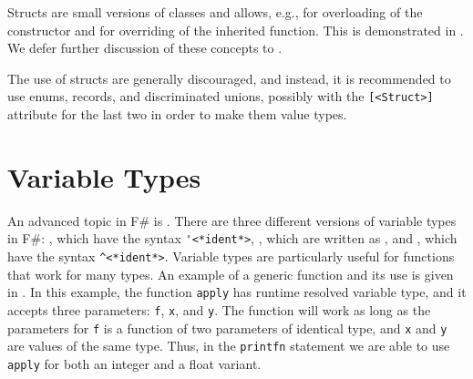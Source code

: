 \documentclass[fsharpnotes.tex]{subfiles}
\begin{document}
Structs are small versions of classes and allows, e.g., for overloading of the  constructor and for overriding of the inherited  function. This is demonstrated in .
%
%
We defer further discussion of these concepts to .

The use of structs are generally discouraged, and instead, it is recommended to use enums, records, and discriminated unions, possibly with the \lstinline{[<Struct>]} attribute for the last two in order to make them value types.

\section{Variable Types}
\label{sec:variableTypes}
An advanced topic in F\# is . There are three different versions of variable types in F\#: , which have the syntax \lstinline[language=syntax]{'<*ident*>}, , which are written as \idx[_@\lstinline{_}]{\lexeme{_}}, and , which have the syntax \lstinline[language=syntax]{^<*ident*>}. Variable types are particularly useful for functions that work for many types.  An example of a generic function and its use is given in .
%
%
In this example, the function \lstinline{apply} has runtime resolved variable type, and it accepts three parameters: \lstinline{f}, \lstinline{x}, and \lstinline{y}. The function will work as long as the parameters for \lstinline{f} is a function of two parameters of identical type, and \lstinline{x} and \lstinline{y} are values of the same type. Thus, in the \lstinline{printfn} statement we are able to use \lstinline{apply} for both an integer and a float variant.
\end{document}
